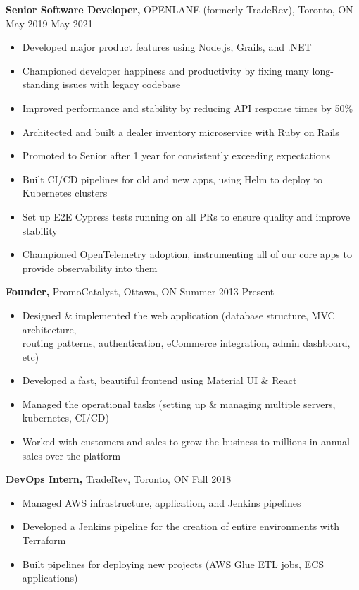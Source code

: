 \documentclass[line, centered]{res}
\begin{document}
\begin{resume}
	{\bf Senior Software Developer,} OPENLANE (formerly TradeRev), Toronto, ON \hfill May 2019-May 2021\\[-8pt]
	\begin{itemize} \itemsep -1pt
		\item Developed major product features using Node.js, Grails, and .NET
		\item Championed developer happiness and productivity by fixing many long-standing issues with legacy codebase
		\item Improved performance and stability by reducing API response times by 50\%
		\item Architected and built a dealer inventory microservice with Ruby on Rails
		\item Promoted to Senior after 1 year for consistently exceeding expectations
		\item Built CI/CD pipelines for old and new apps, using Helm to deploy to Kubernetes clusters
		\item Set up E2E Cypress tests running on all PRs to ensure quality and improve stability
		\item Championed OpenTelemetry adoption, instrumenting all of our core apps to provide observability into them
	\end{itemize}

	{\bf Founder,} PromoCatalyst, Ottawa, ON \hfill Summer 2013-Present\\[-8pt]
	\begin{itemize} \itemsep -1pt
		\item Designed \& implemented the web application (database structure, MVC architecture,\\
		      routing patterns, authentication, eCommerce integration, admin dashboard, etc)
		\item Developed a fast, beautiful frontend using Material UI \& React
		\item Managed the operational tasks (setting up \& managing multiple servers, kubernetes, CI/CD)
		\item Worked with customers and sales to grow the business to millions in annual sales over the platform
	\end{itemize}


	{\bf DevOps Intern,} TradeRev, Toronto, ON \hfill Fall 2018\\[-8pt]
	\begin{itemize} \itemsep -1pt
		\item Managed AWS infrastructure, application, and Jenkins pipelines
		\item Developed a Jenkins pipeline for the creation of entire environments with Terraform
		\item Built pipelines for deploying new projects (AWS Glue ETL jobs, ECS applications)
	\end{itemize}


\end{resume}
\end{document}
